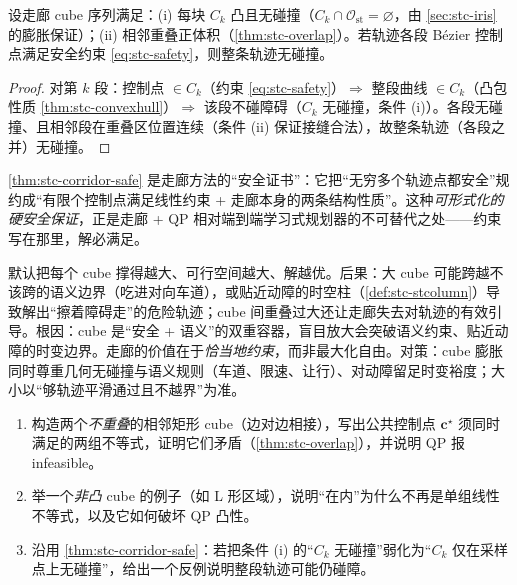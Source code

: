 \begin{theorem}[走廊保证整条轨迹无碰撞]\label{thm:stc-corridor-safe}
设走廊 cube 序列满足：(i) 每块 $C_k$ 凸且无碰撞（$C_k\cap\mathcal{O}_{\mathrm{st}}=\varnothing$，由 \cref{sec:stc-iris} 的膨胀保证）；(ii) 相邻重叠正体积（\cref{thm:stc-overlap}）。若轨迹各段 Bézier 控制点满足安全约束 \cref{eq:stc-safety}，则整条轨迹无碰撞。
\end{theorem}
\begin{proof}
对第 $k$ 段：控制点 $\in C_k$（约束 \cref{eq:stc-safety}）$\Rightarrow$ 整段曲线 $\in C_k$（凸包性质 \cref{thm:stc-convexhull}）$\Rightarrow$ 该段不碰障碍（$C_k$ 无碰撞，条件 (i)）。各段无碰撞、且相邻段在重叠区位置连续（条件 (ii) 保证接缝合法），故整条轨迹（各段之并）无碰撞。
\end{proof}

\noindent \cref{thm:stc-corridor-safe} 是走廊方法的“安全证书”：它把“无穷多个轨迹点都安全”规约成“有限个控制点满足线性约束 + 走廊本身的两条结构性质”。这种\emph{可形式化的硬安全保证}，正是走廊 + QP 相对端到端学习式规划器的不可替代之处——约束写在那里，解必满足。

\begin{pitfall}
默认把每个 cube 撑得越大、可行空间越大、解越优。后果：大 cube 可能跨越不该跨的语义边界（吃进对向车道），或贴近动障的时空柱（\cref{def:stc-stcolumn}）导致解出“擦着障碍走”的危险轨迹；cube 间重叠过大还让走廊失去对轨迹的有效引导。根因：cube 是“安全 + 语义”的双重容器，盲目放大会突破语义约束、贴近动障的时变边界。走廊的价值在于\emph{恰当地约束}，而非最大化自由。对策：cube 膨胀同时尊重几何无碰撞与语义规则（车道、限速、让行）、对动障留足时变裕度；大小以“够轨迹平滑通过且不越界”为准。
\end{pitfall}

\begin{practice}
\begin{enumerate}
  \item 构造两个\emph{不重叠}的相邻矩形 cube（边对边相接），写出公共控制点 $\mathbf{c}^\star$ 须同时满足的两组不等式，证明它们矛盾（\cref{thm:stc-overlap}），并说明 QP 报 infeasible。
  \item 举一个\emph{非凸} cube 的例子（如 L 形区域），说明“在内”为什么不再是单组线性不等式，以及它如何破坏 QP 凸性。
  \item 沿用 \cref{thm:stc-corridor-safe}：若把条件 (i) 的“$C_k$ 无碰撞”弱化为“$C_k$ 仅在采样点上无碰撞”，给出一个反例说明整段轨迹可能仍碰障。
\end{enumerate}
\end{practice}

